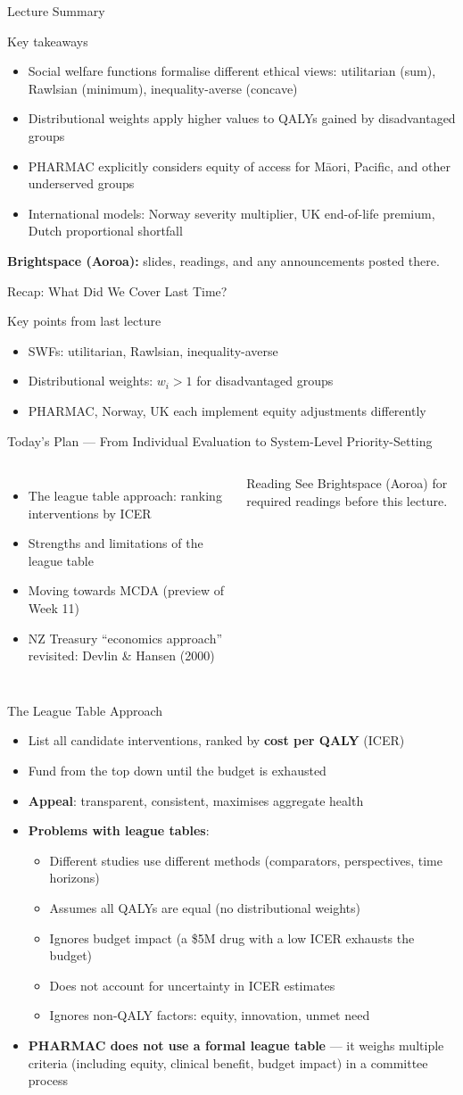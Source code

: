 \documentclass[aspectratio=169, 12pt]{beamer}
\newcommand{\recapslide}[1]{%
  \begin{frame}{Recap: What Did We Cover Last Time?}
    \begin{block}{Key points from last lecture}
      \begin{itemize}#1\end{itemize}
    \end{block}
  \end{frame}}
\newcommand{\planslide}[2]{%
  \begin{frame}{Today's Plan — #1}
    \begin{columns}
      \column{0.6\textwidth}
      \begin{itemize}#2\end{itemize}
      \column{0.38\textwidth}
      \begin{alertblock}{Reading}
        \footnotesize See Brightspace (Aoroa) for required readings before this lecture.
      \end{alertblock}
    \end{columns}
  \end{frame}}
\newcommand{\summaryside}[1]{%
  \begin{frame}{Lecture Summary}
    \begin{exampleblock}{Key takeaways}
      \begin{itemize}#1\end{itemize}
    \end{exampleblock}
    \vspace{0.5em}
    {\footnotesize\textcolor{OtagoGold}{\textbf{Brightspace (Aoroa):}} slides, readings, and any announcements posted there.}
  \end{frame}}
\begin{document}
\summaryside{
  \item Social welfare functions formalise different ethical views: utilitarian (sum), Rawlsian (minimum), inequality-averse (concave)
  \item Distributional weights apply higher values to QALYs gained by disadvantaged groups
  \item PHARMAC explicitly considers equity of access for Māori, Pacific, and other underserved groups
  \item International models: Norway severity multiplier, UK end-of-life premium, Dutch proportional shortfall
}

\recapslide{
  \item SWFs: utilitarian, Rawlsian, inequality-averse
  \item Distributional weights: $w_i > 1$ for disadvantaged groups
  \item PHARMAC, Norway, UK each implement equity adjustments differently
}

\planslide{From Individual Evaluation to System-Level Priority-Setting}{
  \item The league table approach: ranking interventions by ICER
  \item Strengths and limitations of the league table
  \item Moving towards MCDA (preview of Week 11)
  \item NZ Treasury ``economics approach'' revisited: Devlin \& Hansen (2000)
}

\begin{frame}{The League Table Approach}
  \begin{itemize}
    \item List all candidate interventions, ranked by \textbf{cost per QALY} (ICER)
    \item Fund from the top down until the budget is exhausted
    \item \textbf{Appeal}: transparent, consistent, maximises aggregate health
    \item \textbf{Problems with league tables}:
    \begin{itemize}
      \item Different studies use different methods (comparators, perspectives, time horizons)
      \item Assumes all QALYs are equal (no distributional weights)
      \item Ignores budget impact (a \$5M drug with a low ICER exhausts the budget)
      \item Does not account for uncertainty in ICER estimates
      \item Ignores non-QALY factors: equity, innovation, unmet need
    \end{itemize}
    \item \textbf{PHARMAC does not use a formal league table} --- it weighs multiple criteria
          (including equity, clinical benefit, budget impact) in a committee process
  \end{itemize}
\end{frame}
\end{document}
